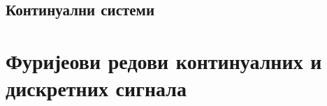 \setcounter{fid}{0}
\graphicspath{{./1_uvod/1_osnovne_osobine_signala/}}
\noindent

\vspace*{\ProblemSep}

\setcounter{fid}{0}
\graphicspath{{./1_uvod/1_osnovne_osobine_signala/}}
\noindent

\vspace*{\ProblemSep}

\setcounter{fid}{0}
\graphicspath{{./1_uvod/1_osnovne_osobine_signala/}}
\noindent

\vspace*{\ProblemSep}

\setcounter{fid}{0}
\graphicspath{{./1_uvod/1_osnovne_osobine_signala/}}
\noindent

\vspace*{\ProblemSep}
\subsection{Континуални системи
}

\setcounter{fid}{0}
\graphicspath{{./1_uvod/2_kontinualni_sistemi/}}
\noindent

\vspace*{\ProblemSep}

\setcounter{fid}{0}
\graphicspath{{./1_uvod/2_kontinualni_sistemi/}}
\noindent

\vspace*{\ProblemSep}

\setcounter{fid}{0}
\graphicspath{{./1_uvod/2_kontinualni_sistemi/}}
\noindent

\vspace*{\ProblemSep}

\setcounter{fid}{0}
\graphicspath{{./1_uvod/2_kontinualni_sistemi/}}
\noindent

\vspace*{\ProblemSep}

\setcounter{fid}{0}
\graphicspath{{./1_uvod/2_kontinualni_sistemi/}}
\noindent

\vspace*{\ProblemSep}
\section{Фуријеови редови континуалних и дискретних сигнала}
